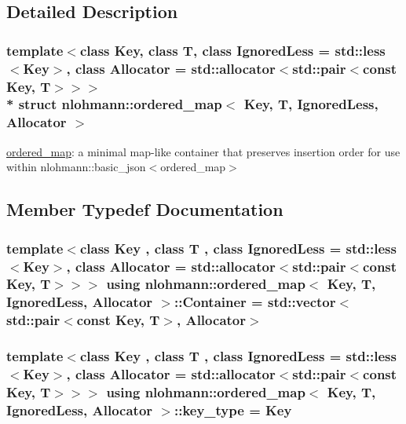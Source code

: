 \subsection{Detailed Description}
\subsubsection*{template$<$class Key, class T, class Ignored\+Less = std\+::less$<$\+Key$>$, class Allocator = std\+::allocator$<$std\+::pair$<$const Key, T$>$$>$$>$\\*
struct nlohmann\+::ordered\+\_\+map$<$ Key, T, Ignored\+Less, Allocator $>$}

\hyperlink{structnlohmann_1_1ordered__map}{ordered\+\_\+map}\+: a minimal map-\/like container that preserves insertion order for use within nlohmann\+::basic\+\_\+json$<$ordered\+\_\+map$>$ 

\subsection{Member Typedef Documentation}
\subsubsection[{\texorpdfstring{Container}{Container}}]{\setlength{\rightskip}{0pt plus 5cm}template$<$class Key , class T , class Ignored\+Less  = std\+::less$<$\+Key$>$, class Allocator  = std\+::allocator$<$std\+::pair$<$const Key, T$>$$>$$>$ using {\bf nlohmann\+::ordered\+\_\+map}$<$ Key, T, Ignored\+Less, Allocator $>$\+::{\bf Container} =  std\+::vector$<$std\+::pair$<$const Key, T$>$, Allocator$>$}\hypertarget{structnlohmann_1_1ordered__map_a0cabe346c38a4f1ab1b8a396fbd2bbe2}{}\label{structnlohmann_1_1ordered__map_a0cabe346c38a4f1ab1b8a396fbd2bbe2}
\subsubsection[{\texorpdfstring{key\+\_\+type}{key_type}}]{\setlength{\rightskip}{0pt plus 5cm}template$<$class Key , class T , class Ignored\+Less  = std\+::less$<$\+Key$>$, class Allocator  = std\+::allocator$<$std\+::pair$<$const Key, T$>$$>$$>$ using {\bf nlohmann\+::ordered\+\_\+map}$<$ Key, T, Ignored\+Less, Allocator $>$\+::{\bf key\+\_\+type} =  Key}\hypertarget{structnlohmann_1_1ordered__map_a57095c6ed403f02e1bc2c240a13c9ed8}{}\label{structnlohmann_1_1ordered__map_a57095c6ed403f02e1bc2c240a13c9ed8}
